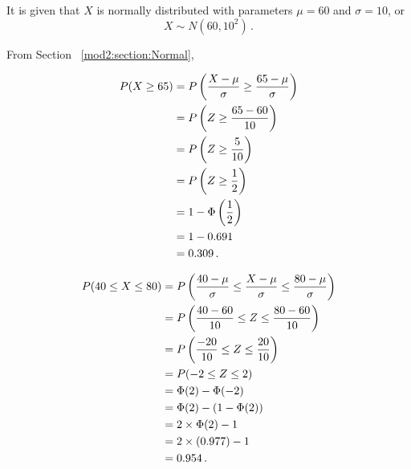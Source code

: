 \begin{subquestions}
\subquestion

It is given that $X$ is normally distributed with parameters $\mu = 60$ and $\sigma = 10$, or
\begin{equation}
	X \sim N(60, 10^2) \,.
\end{equation}

From Section ~\ref{mod2:section:Normal},

\begin{subsubquestions}
	
\subsubquestion

\begin{align}
	P(X \geq 65) & = P\left( \frac{X-\mu}{\sigma} \geq \frac{65-\mu}{\sigma} \right) \nonumber \\
	             & = P\left(Z \geq \frac{65-60}{10} \right) \nonumber \\
	             & = P\left(Z \geq \frac{5}{10} \right) \nonumber \\
	             & = P\left(Z \geq \frac{1}{2} \right) \nonumber \\
	             & = 1 - \Phi\left(\frac{1}{2} \right) \nonumber \\
	             & = 1 - 0.691 \nonumber \\
	             & = 0.309 \,.	
\end{align}


\subsubquestion

\begin{align}
	P(40 \leq X \leq 80) & = P \left( \frac{40-\mu}{\sigma} \leq \frac{X-\mu}{\sigma} \leq \frac{80-\mu}{\sigma} \right) \nonumber \\
	                     & = P \left( \frac{40-60}{10} \leq Z \leq \frac{80-60}{10} \right) \nonumber \\
	                     & = P \left( \frac{-20}{10} \leq Z \leq \frac{20}{10} \right) \nonumber \\
						 & = P(-2 \leq Z \leq 2) \nonumber \\
						 & = \Phi(2) - \Phi(-2) \nonumber \\
						 & = \Phi(2) - (1 - \Phi(2)) \nonumber \\
						 & = 2 \times \Phi(2) - 1 \nonumber \\
						 & = 2 \times (0.977) - 1 \nonumber \\
						 & = 0.954 \,.
\end{align}


\end{subsubquestions}

\end{subquestions}

